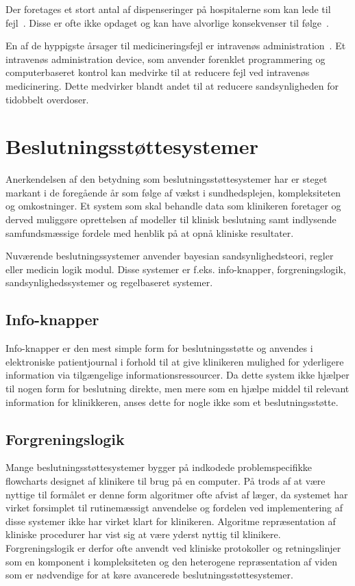 Der foretages et stort antal af dispenseringer på hospitalerne som kan lede til fejl~\citep{Agrawal2009}. Disse er ofte ikke opdaget og kan have alvorlige konsekvenser til følge~\citep{Simpson2008}.

En af de hyppigste årsager til medicineringsfejl er intravenøs administration~\citep{Kaushal2002}. Et intravenøs administration device, som anvender forenklet programmering og computerbaseret kontrol kan medvirke til at reducere fejl ved intravenøs medicinering. Dette medvirker blandt andet til at reducere sandsynligheden for tidobbelt overdoser.~\citep{Kaushal2002}


\section{Beslutningsstøttesystemer}
Anerkendelsen af den betydning som beslutningsstøttesystemer har er steget markant i de foregående år som følge af vækst i sundhedsplejen, kompleksiteten og omkostninger. Et system som skal behandle data som klinikeren foretager og derved muliggøre oprettelsen af modeller til klinisk beslutning samt indlysende samfundsmæssige fordele med henblik på at opnå kliniske resultater. 

Nuværende beslutningssystemer anvender bayesian sandsynlighedsteori, regler eller medicin logik modul. Disse systemer er f.eks. info-knapper, forgreningslogik, sandsynlighedssystemer og regelbaseret systemer. 

\subsection{Info-knapper}
Info-knapper er den mest simple form for beslutningsstøtte og anvendes i elektroniske patientjournal i forhold til at give klinikeren mulighed for yderligere information via tilgængelige informationsressourcer. Da dette system ikke hjælper til nogen form for beslutning direkte, men mere som en hjælpe middel til relevant information for klinikkeren, anses dette for nogle ikke som et beslutningsstøtte. 

\subsection{Forgreningslogik}
Mange beslutningsstøttesystemer bygger på indkodede problemspecifikke flowcharts designet af klinikere til brug på en computer. På trods af at være nyttige til formålet er  denne form algoritmer ofte afvist af læger, da systemet har virket forsimplet til rutinemæssigt anvendelse og fordelen ved implementering af disse systemer ikke har virket klart for klinikeren. Algoritme repræsentation af kliniske procedurer har vist sig at være yderst nyttig til klinikere. Forgreningslogik er derfor ofte anvendt ved kliniske protokoller og retningslinjer som en komponent i kompleksiteten og den heterogene repræsentation af viden som er nødvendige for at køre avancerede beslutningsstøttesystemer. 

